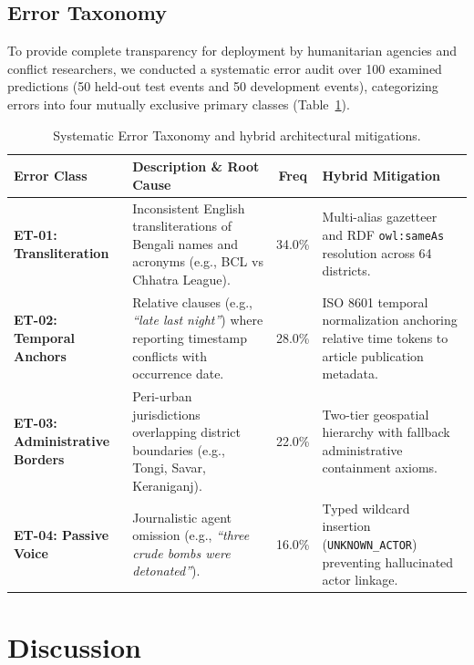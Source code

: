 \documentclass[11pt,a4paper]{article}
\begin{document}
\subsection{Error Taxonomy}
\label{sec:errortaxonomy}

To provide complete transparency for deployment by humanitarian agencies and conflict researchers,
we conducted a systematic error audit over 100 examined predictions (50 held-out test events and 50 development events),
categorizing errors into four mutually exclusive primary classes (Table~\ref{tab:errortaxonomy}).

\begin{table}[ht]
\centering
\small
\caption{Systematic Error Taxonomy and hybrid architectural mitigations.}
\label{tab:errortaxonomy}
\begin{tabular}{lp{3.8cm}cp{4.2cm}}
\toprule
\textbf{Error Class} & \textbf{Description \& Root Cause} & \textbf{Freq} & \textbf{Hybrid Mitigation} \\
\midrule
\textbf{ET-01: Transliteration} & Inconsistent English transliterations of Bengali names and acronyms (e.g., BCL vs Chhatra League). & 34.0\% & Multi-alias gazetteer and RDF \texttt{owl:sameAs} resolution across 64 districts. \\
\textbf{ET-02: Temporal Anchors} & Relative clauses (e.g., \textit{``late last night''}) where reporting timestamp conflicts with occurrence date. & 28.0\% & ISO 8601 temporal normalization anchoring relative time tokens to article publication metadata. \\
\textbf{ET-03: Administrative Borders} & Peri-urban jurisdictions overlapping district boundaries (e.g., Tongi, Savar, Keraniganj). & 22.0\% & Two-tier geospatial hierarchy with fallback administrative containment axioms. \\
\textbf{ET-04: Passive Voice} & Journalistic agent omission (e.g., \textit{``three crude bombs were detonated''}). & 16.0\% & Typed wildcard insertion (\texttt{UNKNOWN\_ACTOR}) preventing hallucinated actor linkage. \\
\bottomrule
\end{tabular}
\end{table}

\section{Discussion}
\label{sec:discussion}
\end{document}
